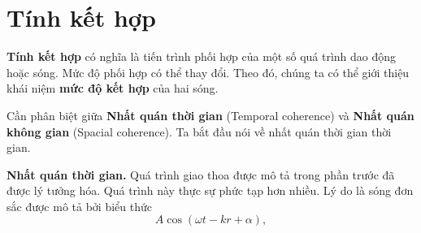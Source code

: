 \section{Tính kết hợp}\label{sec:17_2}

\textbf{Tính kết hợp} có nghĩa là tiến trình phối hợp của một số quá trình dao động hoặc sóng.
Mức độ phối hợp có thể thay đổi.
Theo đó, chúng ta có thể giới thiệu khái niệm \textbf{mức độ kết hợp} của hai sóng.

Cần phân biệt giữa \textbf{Nhất quán thời gian} (Temporal coherence) và \textbf{Nhất quán không gian} (Spacial coherence).
Ta bắt đầu nói về nhất quán thời gian thời gian.

\textbf{Nhất quán thời gian.}
Quá trình giao thoa được mô tả trong phần trước đã được lý tưởng hóa.
Quá trình này thực sự phức tạp hơn nhiều.
Lý do là sóng đơn sắc được mô tả bởi biểu thức
\begin{equation*}
    A \cos(\omega t - kr + \alpha),
\end{equation*}

